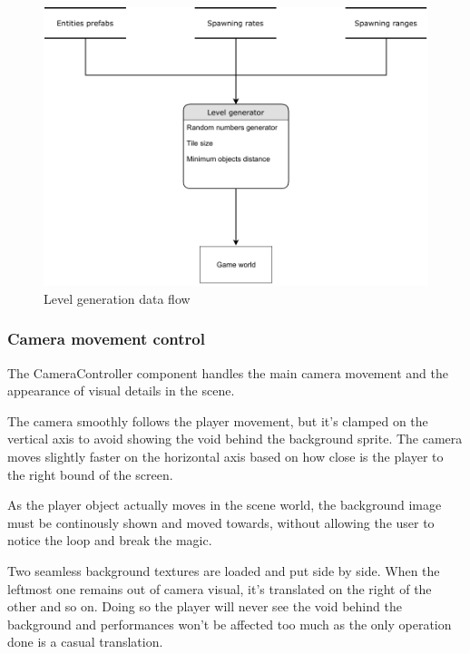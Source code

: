 \documentclass[11pt]{article}
\begin{document}
\begin{figure}[H]
  \centering
  \includegraphics[width=1.0\textwidth]{figures/level_generator}
  \caption{Level generation data flow}
\end{figure}

\subsubsection{Camera movement control}
The CameraController component handles the main camera movement and the appearance of visual details in the scene.

The camera smoothly follows the player movement, but it's clamped on the vertical axis to avoid showing the void behind the background sprite. The camera moves slightly faster on the horizontal axis based on how close is the player to the right bound of the screen.

As the player object actually moves in the scene world, the background image must be continously shown and moved towards, without allowing the user to notice the loop and break the magic.

Two seamless background textures are loaded and put side by side. When the leftmost one remains out of camera visual, it's translated on the right of the other and so on.
Doing so the player will never see the void behind the background and performances won't be affected too much as the only operation done is a casual translation.
\end{document}
